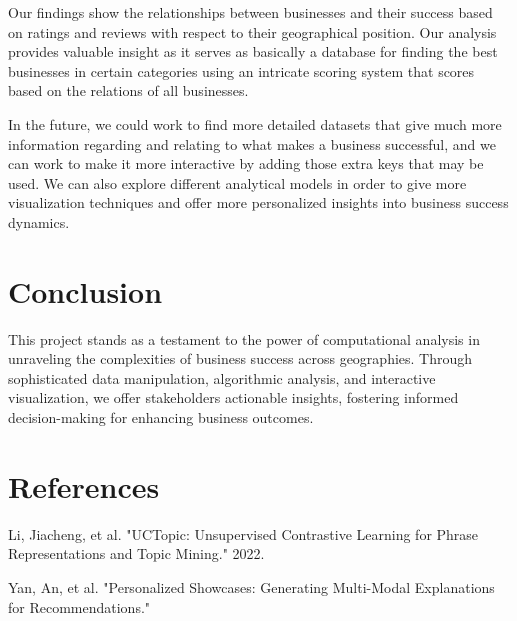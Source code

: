 \documentclass[fontsize=11pt]{article}
\begin{document}
Our findings show the relationships between businesses and their success based on ratings and reviews with respect to their geographical position. Our analysis provides valuable insight as it serves as basically a database for finding the best businesses in certain categories using an intricate scoring system that scores based on the relations of all businesses.

In the future, we could work to find more detailed datasets that give much more information regarding and relating to what makes a business successful, and we can work to make it more interactive by adding those extra keys that may be used. We can also explore different analytical models in order to give more visualization techniques and offer more personalized insights into business success dynamics.

\section*{Conclusion}

This project stands as a testament to the power of computational analysis in unraveling the complexities of business success across geographies. Through sophisticated data manipulation, algorithmic analysis, and interactive visualization, we offer stakeholders actionable insights, fostering informed decision-making for enhancing business outcomes.

\section*{References}

Li, Jiacheng, et al. "UCTopic: Unsupervised Contrastive Learning for Phrase Representations and Topic Mining." 2022.

Yan, An, et al. "Personalized Showcases: Generating Multi-Modal Explanations for Recommendations."
\end{document}
